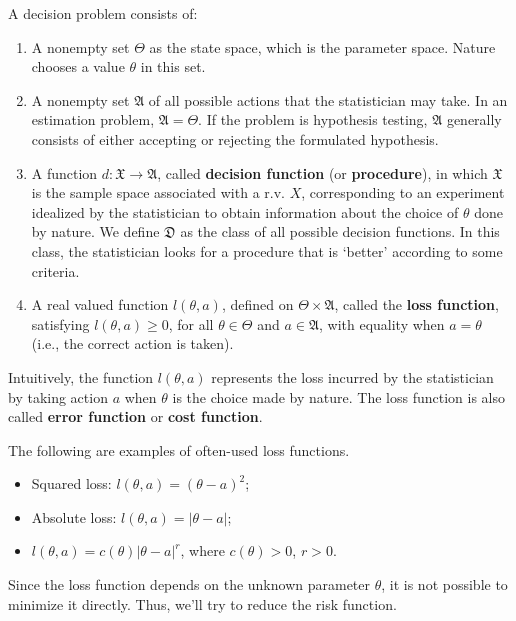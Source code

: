 \documentclass[12pt,a4paper]{report}
\begin{document}
A decision problem consists of:
\begin{enumerate}
    \item A nonempty set $\Theta$ as the state space, which is the parameter space. Nature chooses a value $\theta$ in this set. 
    \item A nonempty set $\mathfrak{A}$ of all possible actions that the statistician may take. In an estimation problem, $\mathfrak{A} = \Theta$. If the problem is hypothesis testing, $\mathfrak{A}$ generally consists of either accepting or rejecting the formulated hypothesis. 
    \item A function $ d : \mathfrak{X} \longrightarrow \mathfrak{A}$, called \textbf{decision function} (or \textbf{procedure}), in which $\mathfrak{X}$ is the sample space associated with a r.v. $X$, corresponding to an experiment idealized by the statistician to obtain information about the choice of $\theta$ done by nature. We define $\mathfrak{D}$ as the class of all possible decision functions. In this class, the statistician looks for a procedure that is `better' according to some criteria. 
    \item A real valued function $l(\theta, a)$, defined on $\Theta \times \mathfrak{A}$, called the \textbf{loss function}, satisfying $l(\theta, a) \geq 0$, for all $\theta \in \Theta$ and $a \in \mathfrak{A}$, with equality when $a = \theta$ (i.e., the correct action is taken).
\end{enumerate}

Intuitively, the function $l(\theta, a)$ represents the loss incurred by the statistician by taking action $a$ when $\theta$ is the choice made by nature. The loss function is also called \textbf{error function} or \textbf{cost function}.

\begin{example}
    The following are examples of often-used loss functions.
    \begin{itemize}
        \item Squared loss: $l(\theta, a) = (\theta - a)^2$;
        \item Absolute loss: $l(\theta, a) = |\theta - a|$;
        \item $l(\theta, a) = c(\theta) |\theta - a|^r$, where $c(\theta) > 0$, $r > 0$.
    \end{itemize}
\end{example}

Since the loss function depends on the unknown parameter $\theta$, it is not possible to minimize it directly. Thus, we'll try to reduce the risk function. 
\end{document}
